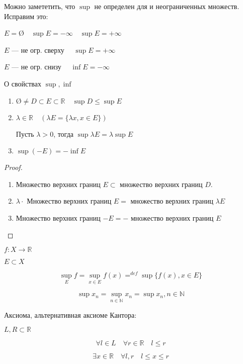 

\cfoot{}



Можно замететить, что $\sup$ не определен для \text{\O} и неограниченных множеств. Исправим это:

$E=$\O $\quad \sup E=-\infty \quad \sup E=+\infty$

$E$ --- не огр. сверху $\quad \sup E=+\infty$

$E$ --- не огр. снизу $\quad \inf E=-\infty$

\begin{lemma}
    О свойствах $\sup, \inf$
    \begin{enumerate}
        \item $\text{\O}\not =D\subset E\subset \mathbb{R} \quad \sup D\leq \sup E$
        \item $\lambda\in\mathbb{R} \quad (\lambda E=\{\lambda x, x\in E\})$

        Пусть $\lambda>0$, тогда $\sup \lambda E=\lambda\sup E$
        \item $\sup(-E)=-\inf E$
    \end{enumerate}
\end{lemma}

\begin{proof}
    \begin{enumerate}
        \item Множество верхних границ $E\subset$ множество верхних границ $D$.
        \item $\lambda\cdot$ Множество верхних границ $E =$ множество верхних границ $\lambda E$
        \item Множество верхних границ $-E = -$ множество верхних границ $E$
    \end{enumerate}
\end{proof}

$f: X\to\mathbb{R}$

$E\subset X$

$$\sup\limits_E f=\sup\limits_{x\in E} f(x) =^{def} \sup\{f(x), x\in E\}$$

$$\sup x_n = \sup\limits_{n\in\mathbb{N}} x_n=\sup{x_n, n\in\mathbb{N}}$$

\begin{axiom}
    Аксиома, альтернативная аксиоме Кантора:

    $L,R\subset \mathbb{R}$

    $$\forall l \in L \quad \forall r\in\mathbb{R} \quad l\leq r$$

    $$\exists x\in\mathbb{R} \quad \forall l, r \quad l\leq x\leq r$$
\end{axiom}

